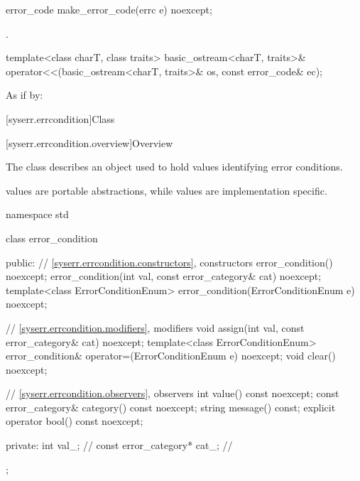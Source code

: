 %
\begin{itemdecl}
error_code make_error_code(errc e) noexcept;
\end{itemdecl}

\begin{itemdescr}
\pnum
\returns {}.
\end{itemdescr}

%
\begin{itemdecl}
template<class charT, class traits>
  basic_ostream<charT, traits>& operator<<(basic_ostream<charT, traits>& os, const error_code& ec);
\end{itemdecl}

\begin{itemdescr}
\pnum
\effects
As if by: 
\end{itemdescr}


[syserr.errcondition]{Class }

[syserr.errcondition.overview]{Overview}

\pnum
The class  describes an object used to hold values identifying
error conditions. \begin{note}  values are portable abstractions,
while  values are implementation specific. \end{note}

%
\begin{codeblock}
namespace std {
  class error_condition {
  public:
    // \ref{syserr.errcondition.constructors}, constructors
    error_condition() noexcept;
    error_condition(int val, const error_category& cat) noexcept;
    template<class ErrorConditionEnum>
      error_condition(ErrorConditionEnum e) noexcept;

    // \ref{syserr.errcondition.modifiers}, modifiers
    void assign(int val, const error_category& cat) noexcept;
    template<class ErrorConditionEnum>
      error_condition& operator=(ErrorConditionEnum e) noexcept;
    void clear() noexcept;

    // \ref{syserr.errcondition.observers}, observers
    int value() const noexcept;
    const error_category& category() const noexcept;
    string message() const;
    explicit operator bool() const noexcept;

  private:
    int val_;                   // \expos
    const error_category* cat_; // \expos
  };
}
\end{codeblock}

